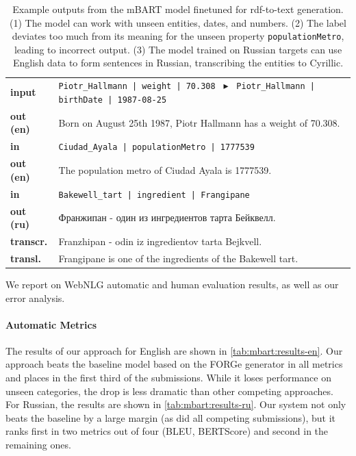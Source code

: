 \begin{table}[t]
    \footnotesize
    \centering
    \begin{tabular}{@{}lp{12.7cm}@{}}
        \textbf{input}    & \texttt{Piotr\_Hallmann | weight | 70.308 }  $\blacktriangleright$ \texttt{ Piotr\_Hallmann | birthDate | 1987-08-25} \\
        \textbf{out (en)} & Born on August 25th 1987, Piotr Hallmann has a weight of 70.308.                                                      \\
        \midrule
        \textbf{in}       & \texttt{Ciudad\_Ayala | populationMetro | 1777539}                                                                    \\
        \textbf{out (en)} & The population metro of Ciudad Ayala is 1777539.                                                                      \\
        \midrule
        \textbf{in}       & \texttt{Bakewell\_tart | ingredient | Frangipane}                                                                     \\
        \textbf{out (ru)} & Франжипан - один из ингредиентов тарта Бейквелл.                                                                      \\[0.1cm]
        \textbf{transcr.} & Franzhipan - odin iz ingredientov tarta Bejkvell.                                                                     \\
        \textbf{transl.}  & Frangipane is one of the ingredients of the Bakewell tart.                                                            \\
    \end{tabular}
    \caption[Example outputs from the mBART model.]{Example outputs from the mBART model finetuned for \ac{rdf}-to-text generation. (1) The model can work with unseen entities, dates, and numbers. (2) The label deviates too much from its meaning for the unseen property \texttt{populationMetro}, leading to incorrect output. (3) The model trained on Russian targets can use English data to form sentences in Russian, transcribing the entities to Cyrillic.}
    \label{tab:mbart:examples}
\end{table}

We report on WebNLG automatic and human evaluation results, as well as our error analysis.

\paragraph{Automatic Metrics}
The results of our approach for English are shown in \autoref{tab:mbart:results-en}. Our approach beats the baseline model based on the FORGe generator \cite{mille2019teaching} in all metrics and places in the first third of the submissions. While it loses performance on unseen categories, the drop is less dramatic than other competing approaches. For Russian, the results are shown in \autoref{tab:mbart:results-ru}. Our system not only beats the baseline by a large margin (as did all competing submissions), but it ranks first in two metrics out of four (BLEU, BERTScore) and second in the remaining ones.

